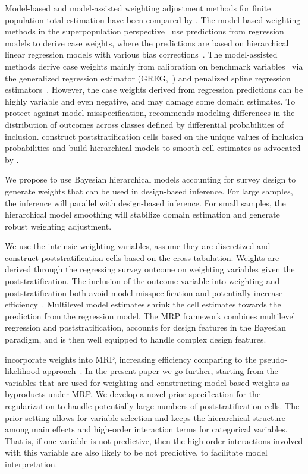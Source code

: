 \documentclass[11pt]{article}
\begin{document}
Model-based and model-assisted weighting adjustment methods for finite population total estimation have been compared by  \cite{henry:valliant12}. The model-based weighting methods in the superpopulation perspective~\citep{FPSi:Valliant00} use predictions from regression models to derive case weights, where the predictions are based on hierarchical linear regression models with various bias corrections~\citep{robustblup:Chambers:JASA93,robust:Firth:JRSSB98}. The model-assisted methods derive case weights mainly from calibration on benchmark variables~\citep{calibration:kott09} via the generalized regression estimator (GREG,~\cite{greg92}) and penalized spline regression estimators~\citep{breidt05}. However, the case weights derived from regression predictions can be highly variable and even negative, and may damage some domain estimates.
To protect against model misspecification, \cite{little83-pi} recommends modeling differences in the distribution of outcomes across classes defined by differential probabilities of inclusion. \cite{bnfp:ba15} construct poststratification cells based on the unique values of inclusion probabilities and build hierarchical models to smooth cell estimates as advocated by \cite{little91, little93}. 


We propose to use Bayesian hierarchical models accounting for survey design to generate weights that can be used in design-based inference. For large samples, the inference will parallel with design-based inference. For small samples, the hierarchical model smoothing will stabilize domain estimation and generate robust weighting adjustment.

We use the intrinsic weighting variables, assume they are discretized and construct poststratification cells based on the cross-tabulation. Weights are derived through the regressing survey outcome on weighting variables given the poststratification. The inclusion of the outcome variable into weighting and poststratification both avoid model misspecification and potentially increase efficiency~\citep{fuller09}. Multilevel model estimates shrink the cell estimates towards the prediction from the regression model. The MRP framework combines multilevel regression and poststratification, accounts for design features in the Bayesian paradigm, and is then well equipped to handle complex design features.

\cite{bnfp:ba15} incorporate weights into MRP, increasing efficiency comparing to the pseudo-likelihood approach~\citep{pfeffermann93}. In the present paper we go further, starting from the variables that are used for weighting and constructing model-based weights as byproducts under MRP. We develop a novel prior specification for the regularization to handle potentially large numbers of poststratification cells. The prior setting allows for variable selection and keeps the hierarchical structure among main effects and high-order interaction terms for categorical variables. That is, if one variable is not predictive, then the high-order interactions involved with this variable are also likely to be not predictive, to facilitate model interpretation.
\end{document}
